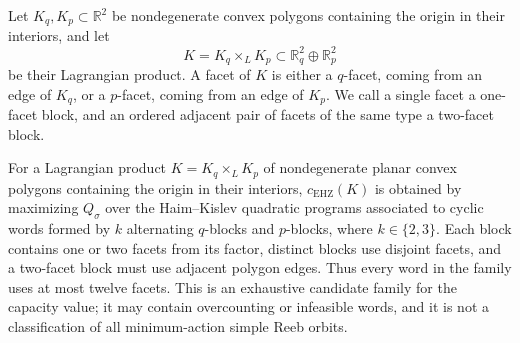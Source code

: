 Let \(K_q,K_p\subset\mathbb{R}^2\) be nondegenerate convex polygons containing
the origin in their interiors, and let
\[
  K=K_q\times_L K_p\subset\mathbb{R}^2_q\oplus\mathbb{R}^2_p
\]
be their Lagrangian product. A facet of \(K\) is either a \(q\)-facet,
coming from an edge of \(K_q\), or a \(p\)-facet, coming from an edge of
\(K_p\). We call a single facet a one-facet block, and an ordered adjacent pair
of facets of the same type a two-facet block.

\begin{theorem}
\label{thm:lagrangian-product-finite-enumeration}
For a Lagrangian product \(K=K_q\times_L K_p\) of nondegenerate planar convex
polygons containing the origin in their interiors, \(c_{\mathrm{EHZ}}(K)\) is
obtained by maximizing \(Q_\sigma\) over the Haim--Kislev quadratic programs
associated to cyclic words formed by $k$ alternating $q$-blocks and
$p$-blocks, where $k\in\{2,3\}$. Each block contains one or two facets
from its factor, distinct blocks use
disjoint facets, and a two-facet block must use adjacent polygon edges. Thus
every word in the family uses at most twelve facets. This is an exhaustive
candidate family for the capacity value; it may contain
overcounting or infeasible words, and it is not a classification of all
minimum-action simple Reeb orbits.
\end{theorem}

